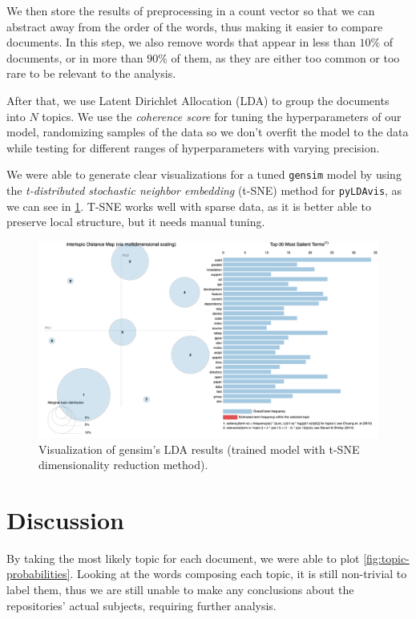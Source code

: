 \documentclass[12pt]{article}
\begin{document}
We then store the results of preprocessing in a count vector so that we can
abstract away from the order of the words, thus making it easier to compare
documents.
In this step, we also remove words that appear in less than $10\%$
of documents, or in more than $90\%$ of them, as they are either
too common or too rare to be relevant to the analysis.

After that, we use Latent Dirichlet Allocation (LDA) to group the documents
into $N$ topics.
We use the \textit{coherence score} for tuning the hyperparameters of our
model, randomizing samples of the data so we don't overfit the model to the data
while testing for different ranges of hyperparameters with varying precision.

We were able to generate clear visualizations for a tuned \verb|gensim| model by using the
\textit{t-distributed stochastic neighbor embedding} (t-SNE) method for
\verb|pyLDAvis|, as we can see in
\ref{fig:lda_gensim_tsne}.
T-SNE works well with sparse data, as it is better able to preserve local
structure, but it needs manual tuning.

\begin{figure}[ht]
    \centering
    \includegraphics[width=\linewidth]{gensim-tsne.png}
    \caption{Visualization of gensim's LDA results (trained model with t-SNE
        dimensionality reduction method).}
    \label{fig:lda_gensim_tsne}
\end{figure}

\section{Discussion} \label{sec:discussion}

By taking the most likely topic for each document, we were able to plot
\ref{fig:topic-probabilities}.
Looking at the words composing each topic, it is still non-trivial to label
them, thus we are still unable to make any conclusions about the
repositories' actual subjects, requiring further analysis.
\end{document}
